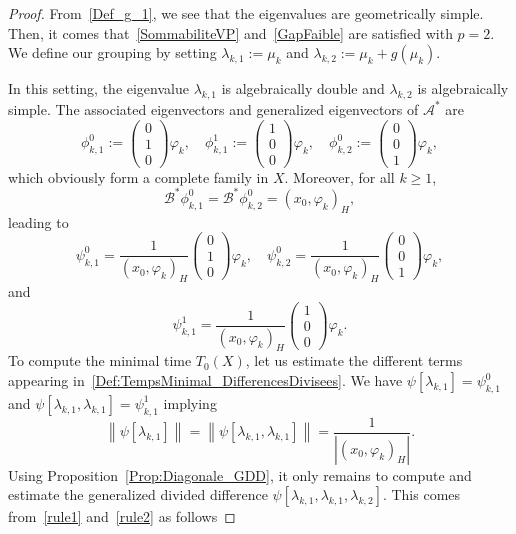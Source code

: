 \documentclass[10pt]{amsart}
\theoremstyle{definition}\newtheorem{defi}[theo]{Definition}\newtheorem{rema}[theo]{Remark}\newtheorem{exam}[theo]{Example}\newtheorem{exem}[theo]{Example}\newtheorem{nota}[theo]{Notation}
\newcommand\As{\mathcal{A}^*}
\newcommand\Bs{\mathcal{B}^*}
\newcommand{\normeX}[1]{\left\| #1 \right\|}
\newcommand{\psH}[2]{\left(#1, #2 \right)_H}
\begin{document}
\begin{proof}
From~\eqref{Def_g_1}, we see that the eigenvalues are geometrically simple. Then, it comes that~\eqref{SommabiliteVP} and~\eqref{GapFaible} are satisfied with $p=2$. We define our grouping by setting $\lambda_{k,1}:=\mu_k$ and $\lambda_{k,2}:=\mu_k+g(\mu_k)$.

In this setting, the eigenvalue $\lambda_{k,1}$ is algebraically double and $\lambda_{k,2}$ is algebraically simple. The associated eigenvectors and generalized eigenvectors of $\As$ are
\[
\phi_{k,1}^0 :=
\begin{pmatrix} 0 \\1\\0
\end{pmatrix} \varphi_k, \quad
\phi_{k,1}^1 :=
\begin{pmatrix} 1\\0\\0
\end{pmatrix} \varphi_k, \quad
\phi_{k,2}^0 :=
\begin{pmatrix} 0\\0\\1
\end{pmatrix} \varphi_k,
\]
which obviously form a complete family in $X$. Moreover, for all $k \geq 1$,
\[
\Bs \phi_{k,1}^0= \Bs \phi_{k,2}^0= \psH{x_0}{\varphi_k},
\]
leading to
\[
\psi_{k,1}^0 = \frac{1}{\psH{x_0}{\varphi_k}}
\begin{pmatrix} 0 \\1\\0
\end{pmatrix} \varphi_k,
\quad
\psi_{k,2}^0 = \frac{1}{\psH{x_0}{\varphi_k}}
\begin{pmatrix} 0\\0\\1
\end{pmatrix} \varphi_k,
\]
and
\[
\psi_{k,1}^1 = \frac{1}{\psH{x_0}{\varphi_k}}
\begin{pmatrix} 1\\0\\0
\end{pmatrix} \varphi_k.
\]
To compute the minimal time $T_0(X)$, let us estimate the different terms appearing in~\eqref{Def:TempsMinimal_DifferencesDivisees}. We have $\psi[\lambda_{k,1}]=\psi_{k,1}^0$ and $\psi[\lambda_{k,1}, \lambda_{k,1}] = \psi_{k,1}^1$ implying
\[
\normeX{\psi[\lambda_{k,1}]} = \normeX{\psi[\lambda_{k,1}, \lambda_{k,1}]} =\frac 1{ | \psH{x_0}{\varphi_k}|}.
\]
Using Proposition~\ref{Prop:Diagonale_GDD}, it only remains to compute and estimate the generalized divided difference $\psi[\lambda_{k,1},\lambda_{k,1},\lambda_{k,2}]$. This comes from~\eqref{rule1} and~\eqref{rule2} as follows

\end{proof}
\end{document}
